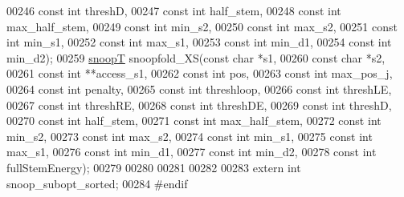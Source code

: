 \begin{DoxyCode}
00246                     \textcolor{keyword}{const} \textcolor{keywordtype}{int} threshD,
00247                     \textcolor{keyword}{const} \textcolor{keywordtype}{int} half\_stem,
00248                     \textcolor{keyword}{const} \textcolor{keywordtype}{int} max\_half\_stem,
00249                     \textcolor{keyword}{const} \textcolor{keywordtype}{int} min\_s2,
00250                     \textcolor{keyword}{const} \textcolor{keywordtype}{int} max\_s2,
00251                     \textcolor{keyword}{const} \textcolor{keywordtype}{int} min\_s1,
00252                     \textcolor{keyword}{const} \textcolor{keywordtype}{int} max\_s1,
00253                     \textcolor{keyword}{const} \textcolor{keywordtype}{int} min\_d1,
00254                     \textcolor{keyword}{const} \textcolor{keywordtype}{int} min\_d2);
00259 \hyperlink{group__data__structures_structsnoopT}{snoopT} snoopfold\_XS(\textcolor{keyword}{const} \textcolor{keywordtype}{char} *s1,
00260                     \textcolor{keyword}{const} \textcolor{keywordtype}{char} *s2,
00261                     \textcolor{keyword}{const} \textcolor{keywordtype}{int} **access\_s1,
00262                     \textcolor{keyword}{const} \textcolor{keywordtype}{int} pos,
00263                     \textcolor{keyword}{const} \textcolor{keywordtype}{int} max\_pos\_j,
00264                     \textcolor{keyword}{const} \textcolor{keywordtype}{int} penalty,
00265                     \textcolor{keyword}{const} \textcolor{keywordtype}{int} threshloop, 
00266                     \textcolor{keyword}{const} \textcolor{keywordtype}{int} threshLE,
00267                     \textcolor{keyword}{const} \textcolor{keywordtype}{int} threshRE,
00268                     \textcolor{keyword}{const} \textcolor{keywordtype}{int} threshDE,
00269                     \textcolor{keyword}{const} \textcolor{keywordtype}{int} threshD,
00270                     \textcolor{keyword}{const} \textcolor{keywordtype}{int} half\_stem,
00271                     \textcolor{keyword}{const} \textcolor{keywordtype}{int} max\_half\_stem,
00272                     \textcolor{keyword}{const} \textcolor{keywordtype}{int} min\_s2,
00273                     \textcolor{keyword}{const} \textcolor{keywordtype}{int} max\_s2,
00274                     \textcolor{keyword}{const} \textcolor{keywordtype}{int} min\_s1,
00275                     \textcolor{keyword}{const} \textcolor{keywordtype}{int} max\_s1,
00276                     \textcolor{keyword}{const} \textcolor{keywordtype}{int} min\_d1,
00277                     \textcolor{keyword}{const} \textcolor{keywordtype}{int} min\_d2,
00278         \textcolor{keyword}{const} \textcolor{keywordtype}{int} fullStemEnergy);
00279 
00280 
00281 
00282 
00283 \textcolor{keyword}{extern} \textcolor{keywordtype}{int} snoop\_subopt\_sorted;
00284 \textcolor{preprocessor}{#endif}
\end{DoxyCode}
